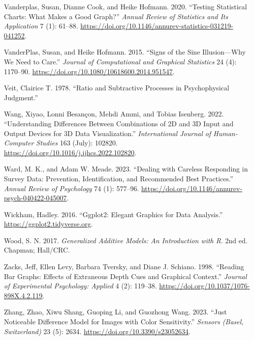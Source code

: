 \documentclass[
  letterpaper,
  DIV=11,
  numbers=noendperiod]{scrartcl}
\newlength{\cslhangindent}
\newenvironment{CSLReferences}[2] %
 {\begin{list}{}{%
  \setlength{\itemindent}{0pt}
  \setlength{\leftmargin}{0pt}
  \setlength{\parsep}{0pt}
  \ifodd #1
   \setlength{\leftmargin}{\cslhangindent}
   \setlength{\itemindent}{-1\cslhangindent}
  \fi
  \setlength{\itemsep}{#2\baselineskip}}}
 {\end{list}}
\begin{document}
\begin{CSLReferences}{1}{0}
Vanderplas, Susan, Dianne Cook, and Heike Hofmann. 2020. {``Testing
Statistical Charts: What Makes a Good Graph?''} \emph{Annual Review of
Statistics and Its Application} 7 (1): 61--88.
\url{https://doi.org/10.1146/annurev-statistics-031219-041252}.

VanderPlas, Susan, and Heike Hofmann. 2015. {``Signs of the {Sine
Illusion}---{Why We Need} to {Care}.''} \emph{Journal of Computational
and Graphical Statistics} 24 (4): 1170--90.
\url{https://doi.org/10.1080/10618600.2014.951547}.

Veit, Clairice T. 1978. {``Ratio and Subtractive Processes in
Psychophysical Judgment.''}

Wang, Xiyao, Lonni Besançon, Mehdi Ammi, and Tobias Isenberg. 2022.
{``Understanding Differences Between Combinations of 2D and 3D Input and
Output Devices for 3D Data Visualization.''} \emph{International Journal
of Human-Computer Studies} 163 (July): 102820.
\url{https://doi.org/10.1016/j.ijhcs.2022.102820}.

Ward, M. K., and Adam W. Meade. 2023. {``Dealing with {Careless
Responding} in {Survey Data}: {Prevention}, {Identification}, and
{Recommended Best Practices}.''} \emph{Annual Review of Psychology} 74
(1): 577--96. \url{https://doi.org/10.1146/annurev-psych-040422-045007}.

Wickham, Hadley. 2016. {``Ggplot2: Elegant Graphics for Data
Analysis.''} \url{https://ggplot2.tidyverse.org}.

Wood, S. N. 2017. \emph{Generalized {A}dditive {M}odels: An Introduction
with {R}}. 2nd ed. Chapman; Hall/CRC.

Zacks, Jeff, Ellen Levy, Barbara Tversky, and Diane J. Schiano. 1998.
{``Reading Bar Graphs: Effects of Extraneous Depth Cues and Graphical
Context.''} \emph{Journal of Experimental Psychology: Applied} 4 (2):
119--38. \url{https://doi.org/10.1037/1076-898X.4.2.119}.

Zhang, Zhao, Xiwu Shang, Guoping Li, and Guozhong Wang. 2023. {``Just
{Noticeable Difference Model} for {Images} with {Color Sensitivity}.''}
\emph{Sensors (Basel, Switzerland)} 23 (5): 2634.
\url{https://doi.org/10.3390/s23052634}.

\end{CSLReferences}
\end{document}
